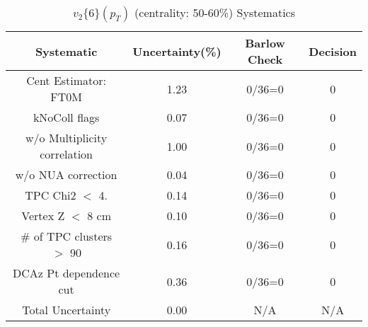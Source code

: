 \begin{table}[htbp]
\caption{$v_2\{6\}(p_{T})$ (centrality: 50-60\%) Systematics}
\label{tab:Sys_pTDiffv26ChFull}
\centering
\begin{tabular}{|c|c|c|c|}
\hline
Systematic & Uncertainty(\%) & Barlow Check & Decision \\
\hline
Cent Estimator: FT0M & 1.23 & 0/36=0 & 0 \\
kNoColl flags & 0.07 & 0/36=0 & 0 \\
w/o Multiplicity correlation & 1.00 & 0/36=0 & 0 \\
w/o NUA correction & 0.04 & 0/36=0 & 0 \\
TPC Chi2 $<$ 4. & 0.14 & 0/36=0 & 0 \\
Vertex Z $<$ 8 cm & 0.10 & 0/36=0 & 0 \\
\# of TPC clusters $>$ 90 & 0.16 & 0/36=0 & 0 \\
DCAz Pt dependence cut & 0.36 & 0/36=0 & 0 \\
\hline
Total Uncertainty & 0.00 & N/A & N/A \\
\hline
\end{tabular}
\end{table}
